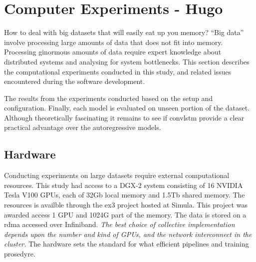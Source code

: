 \chapter{Computer Experiments - Hugo} \label{ch:computer_experiments}
How to deal with big datasets that will easily eat up you memory? ``Big data'' involve processing large amounts of data that does not fit into memory. Processing ginormous amounts of data require expert knowledge about distributed systems and analysing for system bottlenecks. This section describes the computational experiments conducted in this study, and related issues encountered during the software development. 


The results from the experiments conducted based on the setup and configuration. %
Finally, each model is evaluated on unseen portion of the dataset. Although theoretically fascinating it remains to see if \acrshort{convlstm} provide a clear practical advantage over the autoregressive models.

\section{Hardware}
Conducting experiments on large datasets require external computational resources.  This study had access to a DGX-2 system consisting of 16 NVIDIA Tesla V100 GPUs, each of 32Gb local memory and 1.5Tb shared memory. The resources is availble through the \acrfull{ex3} project hosted at Simula. This project was awarded access 1 GPU and 1024G part of the memory. The data is stored on a \acrfull{rdma} accessed over Infiniband.
\textit{The best choice of collective implementation depends upon the number and kind of GPUs, and the network interconnect in the cluster.} The hardware sets the standard for what  efficient pipelines and training prosedyre. 

